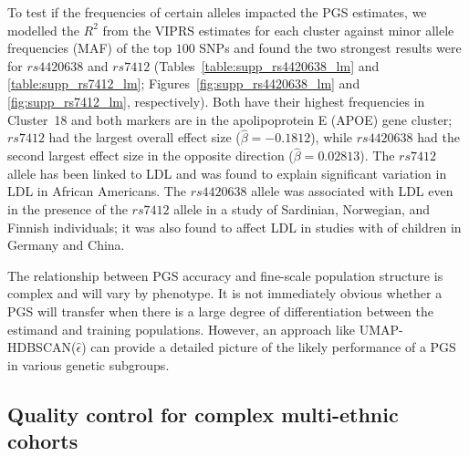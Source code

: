 To test if the frequencies of certain alleles impacted the PGS estimates, we modelled the $R^2$ from the VIPRS estimates for each cluster against minor allele frequencies (MAF) of the top $100$ SNPs and found the two strongest results were for $rs4420638$ and $rs7412$ (Tables~\ref{table:supp_rs4420638_lm} and \ref{table:supp_rs7412_lm}; Figures~\ref{fig:supp_rs4420638_lm} and \ref{fig:supp_rs7412_lm}, respectively).  Both have their highest frequencies in Cluster~18 and both markers are in the apolipoprotein E (APOE) gene cluster; $rs7412$ had the largest overall effect size ($\hat{\beta}=-0.1812$), while $rs4420638$ had the second largest effect size in the opposite direction ($\hat{\beta}=0.02813$). The $rs7412$ allele has been linked to LDL\citep{bennet_pleiotropy_2010} and was found to explain significant variation in LDL in African Americans\citep{rasmussen-torvik_high_2012}. The $rs4420638$ allele was associated with LDL even in the presence of the $rs7412$ allele in a study of Sardinian, Norwegian, and Finnish individuals\citep{sanna_fine_2011}; it was also found to affect LDL in studies with of children in Germany\citep{breitling_genetic_2015} and China\citep{wang_associations_2022}.

The relationship between PGS accuracy and fine-scale population structure is complex and will vary by phenotype. It is not immediately obvious whether a PGS will transfer when there is a large degree of differentiation between the estimand and training populations. However, an approach like UMAP-HDBSCAN($\hat{\epsilon}$) can provide a detailed picture of the likely performance of a PGS in various genetic subgroups.

\clearpage

\subsection{Quality control for complex multi-ethnic cohorts}

